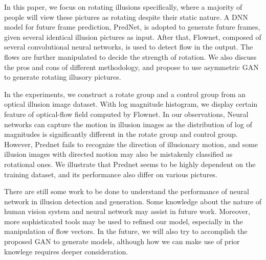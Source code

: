 \documentclass[journal]{IEEEtran}
\begin{document}
  In this paper, we focus on rotating illusions specifically, where a majority of people will view these pictures as rotating despite their static nature. A DNN model for future frame prediction, PredNet, is adopted to generate future frames, given several identical illusion pictures as input. After that, Flownet, composed of several convolutional neural networks, is used to detect flow in the output. The flows are further manipulated to decide the strength of rotation. We also discuss the pros and cons of different methodology, and propose to use asymmetric GAN to generate rotating illusory pictures. 
  
  In the experiments, we construct a rotate group and a control group from an optical illusion image dataset. With log magnitude histogram, we display certain feature of optical-flow field computed by Flownet. In our observations, Neural networks can capture the motion in illusion images as the distribution of log of magnitudes is significantly different in the rotate group and control group. However, Prednet fails to recognize the direction of illusionary motion, and some illusion images with directed motion may also be mistakenly classified as rotational ones. We illustrate that Prednet seems to be highly dependent on the training dataset, and its performance also differ on various pictures.
  
  There are still some work to be done to understand the performance of neural network in illusion detection and generation. Some knowledge about the nature of human vision system and neural network may assist in future work. Moreover, more sophisticated tools may be used to refined our model, especially in the manipulation of flow vectors. In the future, we will also try to accomplish the proposed GAN to generate models, although how we can make use of prior knowlege requires deeper consideration.
  
  
  
  
  
  
\end{document}
